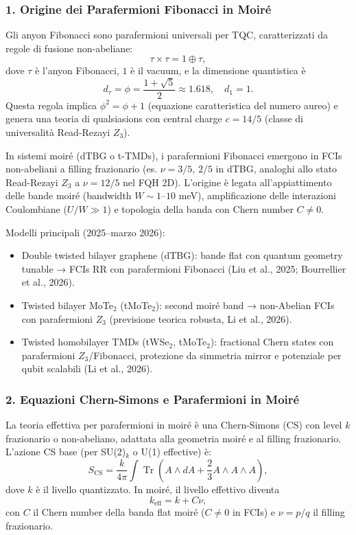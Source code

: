 \documentclass[11pt,a4paper]{article}
\theoremstyle{plain}
\theoremstyle{definition}
\begin{document}
\subsubsection{1. Origine dei Parafermioni Fibonacci in Moiré}

Gli anyon Fibonacci sono parafermioni universali per TQC, caratterizzati da regole di fusione non-abeliane:
\begin{equation}
\tau \times \tau = 1 \oplus \tau,
\end{equation}
dove $\tau$ è l'anyon Fibonacci, $1$ è il vacuum, e la dimensione quantistica è
\begin{equation}
d_\tau = \phi = \frac{1 + \sqrt{5}}{2} \approx 1.618, \quad d_1 = 1.
\end{equation}
Questa regola implica $\phi^2 = \phi + 1$ (equazione caratteristica del numero aureo) e genera una teoria di qualsiasions con central charge $c = 14/5$ (classe di universalità Read-Rezayi $Z_3$).

In sistemi moiré (dTBG o t-TMDs), i parafermioni Fibonacci emergono in FCIs non-abeliani a filling frazionario (es. $\nu = 3/5$, $2/5$ in dTBG, analoghi allo stato Read-Rezayi $Z_3$ a $\nu = 12/5$ nel FQH 2D). L'origine è legata all'appiattimento delle bande moiré (bandwidth $W \sim 1$--$10$ meV), amplificazione delle interazioni Coulombiane ($U/W \gg 1$) e topologia della banda con Chern number $C \neq 0$.

Modelli principali (2025–marzo 2026):
\begin{itemize}
    \item Double twisted bilayer graphene (dTBG): bande flat con quantum geometry tunable → FCIs RR con parafermioni Fibonacci (Liu et al., 2025; Bourrellier et al., 2026).
    \item Twisted bilayer MoTe$_2$ (tMoTe$_2$): second moiré band → non-Abelian FCIs con parafermioni $Z_3$ (previsione teorica robusta, Li et al., 2026).
    \item Twisted homobilayer TMDs (tWSe$_2$, tMoTe$_2$): fractional Chern states con parafermioni $Z_3$/Fibonacci, protezione da simmetria mirror e potenziale per qubit scalabili (Li et al., 2026).
\end{itemize}

\subsubsection{2. Equazioni Chern-Simons e Parafermioni in Moiré}

La teoria effettiva per parafermioni in moiré è una Chern-Simons (CS) con level $k$ frazionario o non-abeliano, adattata alla geometria moiré e al filling frazionario. L'azione CS base (per SU(2)$_k$ o U(1) effective) è:
\begin{equation}
S_{\mathrm{CS}} = \frac{k}{4\pi} \int \operatorname{Tr} \left( A \wedge dA + \frac{2}{3} A \wedge A \wedge A \right),
\end{equation}
dove $k$ è il livello quantizzato. In moiré, il livello effettivo diventa
\begin{equation}
k_{\mathrm{eff}} = k + C\nu,
\end{equation}
con $C$ il Chern number della banda flat moiré ($C \neq 0$ in FCIs) e $\nu = p/q$ il filling frazionario.
\end{document}
